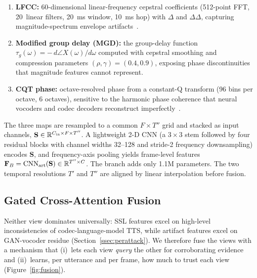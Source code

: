 \begin{enumerate}
\item \textbf{LFCC:} 60-dimensional linear-frequency cepstral coefficients (512-point
  FFT, 20~linear filters, 20~ms window, 10~ms hop) with $\Delta$ and $\Delta\Delta$,
  capturing magnitude-spectrum envelope artifacts~\cite{sahidullah2015comparison}.
\item \textbf{Modified group delay (MGD):} the group-delay function
  $\tau_g(\omega) = -\,d\angle X(\omega)/d\omega$ computed with cepstral smoothing and
  compression parameters $(\rho, \gamma) = (0.4, 0.9)$, exposing phase discontinuities
  that magnitude features cannot represent.
\item \textbf{CQT phase:} octave-resolved phase from a constant-Q transform (96 bins per
  octave, 6 octaves), sensitive to the harmonic phase coherence that neural vocoders
  and codec decoders reconstruct imperfectly~\cite{todisco2017constantq,xie2025codecfake}.
\end{enumerate}

The three maps are resampled to a common $F \times T''$ grid and stacked as input
channels, $\mathbf{S} \in \mathbb{R}^{C_{\text{in}} \times F \times T''}$. A lightweight 2-D CNN
(a $3{\times}3$ stem followed by four residual blocks with channel widths 32--128 and
stride-2 frequency downsampling) encodes $\mathbf{S}$, and frequency-axis pooling yields
frame-level features $\mathbf{F}_B = \operatorname{CNN}_{\text{art}}(\mathbf{S}) \in
\mathbb{R}^{T'' \times C}$. The branch adds only 1.1M parameters. The two temporal resolutions
$T'$ and $T''$ are aligned by linear interpolation before fusion.

\subsection{Gated Cross-Attention Fusion}
\label{ssec:fusion}

Neither view dominates universally: SSL features excel on high-level inconsistencies of
codec-language-model TTS, while artifact features excel on GAN-vocoder residue
(Section~\ref{ssec:perattack}). We therefore fuse the views with a mechanism that
(i)~lets each view \emph{query} the other for corroborating evidence and (ii)~learns,
per utterance and per frame, how much to trust each view (Figure~\ref{fig:fusion}).

